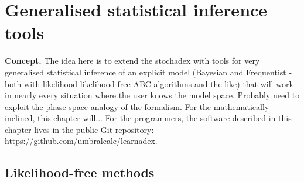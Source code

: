 \chapter{\sffamily Generalised statistical inference tools}

{\bfseries\sffamily Concept.} The idea here is to extend the stochadex with tools for very generalised statistical inference of an explicit model (Bayesian and Frequentist - both with likelihood likelihood-free ABC algorithms and the like) that will work in nearly every situation where the user knows the model space. Probably need to exploit the phase space analogy of the formalism. For the mathematically-inclined, this chapter will... For the programmers, the software described in this chapter lives in the public Git repository: \href{https://github.com/umbralcalc/learnadex}{https://github.com/umbralcalc/learnadex}.


\section{\sffamily Likelihood-free methods}